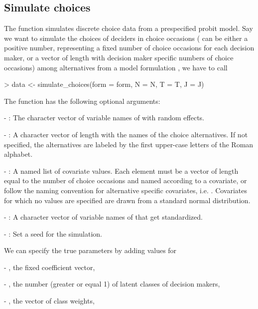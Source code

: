 \documentclass[article]{jss}
\newcommand{\fct}[1]{\code{#1()}}
\begin{document}
\subsection{Simulate choices} \label{subsec:simulate_choices}

The \fct{simulate\_choices} function simulates discrete choice data from a prespecified probit model. Say we want to simulate the choices of  deciders in  choice occasions ( can be either a positive number, representing a fixed number of choice occasions for each decision maker, or a vector of length  with decision maker specific numbers of choice occasions) among  alternatives from a model formulation , we have to call

\begin{Schunk}
\begin{Sinput}
> data <- simulate_choices(form = form, N = N, T = T, J = J)
\end{Sinput}
\end{Schunk}

The function \fct{simulate\_choices} has the following optional arguments:

- : The character vector of variable names of  with random effects.

- : A character vector of length  with the names of the choice alternatives. If not specified, the alternatives are labeled by the first  upper-case letters of the Roman alphabet.

- : A named list of covariate values. Each element must be a vector of length equal to the number of choice occasions and named according to a covariate, or follow the naming convention for alternative specific covariates, i.e. . Covariates for which no values are specified are drawn from a standard normal distribution.

- : A character vector of variable names of  that get standardized.

- : Set a seed for the simulation.

We can specify the true parameters by adding values for

- , the fixed coefficient vector,

- , the number (greater or equal 1) of latent classes of decision makers,

- , the vector of class weights,
\end{document}
